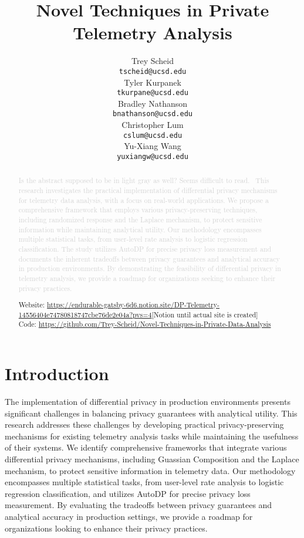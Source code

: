 \documentclass[12pt,letterpaper]{article}
\title{Novel Techniques in Private Telemetry Analysis}
\author{Trey Scheid \\
  {\tt tscheid@ucsd.edu} \\\And
  Tyler Kurpanek \\
  {\tt tkurpane@ucsd.edu} \\\And
  Bradley Nathanson \\
  {\tt bnathanson@ucsd.edu} \\\And
  Christopher Lum \\
  {\tt cslum@ucsd.edu} \\\And
  Yu-Xiang Wang \\
  {\tt yuxiangw@ucsd.edu} \\}
\begin{document}
\maketitle




\begin{abstract}    
  \textcolor{LightGrey}{Is the abstract supposed to be in light gray as well? Seems difficult to read. \
  This research investigates the practical implementation of differential privacy mechanisms for telemetry data analysis, with a focus on real-world applications. We propose a comprehensive framework that employs various privacy-preserving techniques, including randomized response and the Laplace mechanism, to protect sensitive information while maintaining analytical utility. Our methodology encompasses multiple statistical tasks, from user-level rate analysis to logistic regression classification. The study utilizes AutoDP for precise privacy loss measurement and documents the inherent tradeoffs between privacy guarantees and analytical accuracy in production environments. By demonstrating the feasibility of differential privacy in telemetry analysis, we provide a roadmap for organizations seeking to enhance their privacy practices.
  }
  \begin{center}
    Website: \url{https://endurable-gatsby-6d6.notion.site/DP-Telemetry-14556404e74780818747cbe76de2e04a?pvs=4}[Notion until actual site is created] \\
    Code: \url{https://github.com/Trey-Scheid/Novel-Techniques-in-Private-Data-Analysis}
  \end{center}
\end{abstract}


\maketoc

\clearpage


\section{Introduction}

The implementation of differential privacy in production environments presents significant challenges in balancing privacy guarantees with analytical utility. This research addresses these challenges by developing practical privacy-preserving mechanisms for existing telemetry analysis tasks while maintaining the usefulness of their systems. We identify comprehensive frameworks that integrate various differential privacy mechanisms, including Guassian Composition and the Laplace mechanism, to protect sensitive information in telemetry data. Our methodology encompasses multiple statistical tasks, from user-level rate analysis to logistic regression classification, and utilizes AutoDP for precise privacy loss measurement. By evaluating the tradeoffs between privacy guarantees and analytical accuracy in production settings, we provide a roadmap for organizations looking to enhance their privacy practices.
\end{document}
